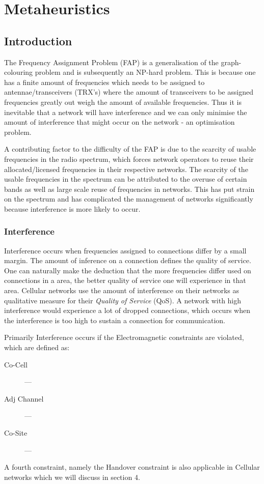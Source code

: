 \chapter{Metaheuristics}
\section{Introduction}
The Frequency Assignment Problem (FAP) is a generalisation of the graph-colouring problem and is subsequently an NP-hard problem. This is because one has a finite amount of frequencies which needs to be 
assigned to antennae/transceivers (TRX's)  where the amount of transceivers to be assigned frequencies greatly out weigh the amount of available frequencies. Thus it is inevitable that a network will 
have interference and we can only minimise the amount of interference that might occur on the network - an optimisation problem. 

A contributing factor to the difficulty of the FAP is due to the scarcity of usable frequencies in the radio spectrum, which forces network operators to reuse their allocated/licensed frequencies in their respective networks. The scarcity of the usable frequencies in the spectrum can be attributed to the overuse of certain bands as well as large scale reuse of frequencies in networks. This has put strain on the spectrum and has complicated the management of networks significantly because interference is more likely to occur.

\subsection{Interference}
Interference occurs when frequencies assigned to connections differ by a small margin. The amount of inference on a connection defines the quality of service. One can naturally make the deduction that 
the more frequencies differ used on connections in a area, the better quality of service one will experience in that area. Cellular networks use the amount of interference on their networks as 
qualitative measure for their \emph{Quality of Service} (QoS). A network with high interference would experience a lot of dropped connections, which occurs when the interference is too high to sustain a connection for communication.

Primarily Interference occurs if the Electromagnetic constraints are violated, which are defined as:
\begin{description}
\item[Co-Cell] ---
\item[Adj Channel] ---
\item[Co-Site] ---
\end{description}
A fourth constraint, namely the Handover constraint is also applicable in Cellular networks which we will discuss in section 4.

